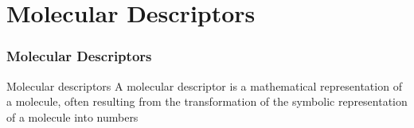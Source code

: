 \documentclass[aspectratio=169]{beamer}
\begin{document}
\section{Molecular Descriptors}
    \begin{frame}
        \frametitle{Molecular Descriptors}
                \begin{block}{Molecular descriptors} 
A molecular \alert{descriptor} is a \alert{mathematical representation} of a
molecule, often resulting from the \alert{transformation} of the \alert{symbolic
representation} of a molecule into \alert{numbers}
        \end{block}

    \end{frame}
\end{document}
